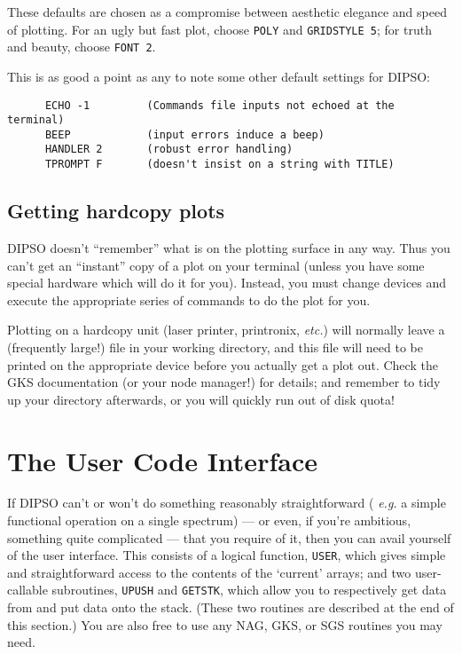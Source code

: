 These defaults are chosen as a compromise between aesthetic elegance
and speed of plotting. For an ugly but fast plot, choose {\tt POLY}
and {\tt GRIDSTYLE 5}; for truth and beauty, choose {\tt FONT 2}.

This is as good a point as any to note some other default settings for
DIPSO:

\begin{verbatim}
      ECHO -1         (Commands file inputs not echoed at the terminal)
      BEEP            (input errors induce a beep)
      HANDLER 2       (robust error handling)
      TPROMPT F       (doesn't insist on a string with TITLE)
\end{verbatim}

\subsection {Getting hardcopy plots}

DIPSO doesn't ``remember'' what is on the plotting surface in any way.
Thus you can't get an ``instant'' copy of a plot on your terminal
(unless you have some special hardware which will do it for you).
Instead, you must change devices and execute the appropriate series
of commands to do the plot for you.

Plotting on a hardcopy unit (laser printer, printronix, {\em etc.})
will normally leave a (frequently large!) file in your working
directory, and this file will need to be printed on the appropriate
device before you actually get a plot out. Check the GKS documentation
(or your node manager!) for details;  and remember to tidy up your
directory afterwards, or you will quickly run out of disk quota!

\section {The User Code Interface}

If DIPSO can't or won't do something reasonably straightforward ({\em
e.g.} a simple functional operation on a single spectrum) --- or even,
if you're ambitious, something quite complicated  ---  that you
require of it, then you can avail yourself of the user interface. This
consists of a logical function, {\tt USER}, which gives simple and
straightforward access to the contents of the `current' arrays; and
two user-callable subroutines, {\tt UPUSH} and {\tt GETSTK}, which
allow you to respectively get data from and put data onto the stack.
(These two routines are described at the end of this section.) You are
also free to use any NAG, GKS, or SGS routines you may need.

